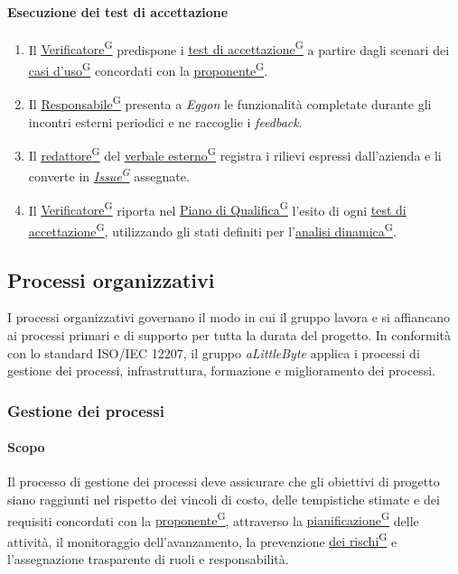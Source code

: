 \documentclass[a4paper,12pt]{article}
\providecommand{\glslink}[2]{\href{https://alittlebyte-19.github.io/Documentazione/glossario.html\#gls-#1}{\underline{#2}\textsuperscript{\scriptsize G}}}
\begin{document}
\paragraph{Esecuzione dei test di accettazione}
\begin{enumerate}
    \item Il \glslink{verificatore}{Verificatore} predispone i \glslink{test-di-accettazione}{test di accettazione} a partire dagli scenari dei \glslink{caso-d-uso-uc}{casi d'uso} concordati con la \glslink{committente-proponente}{proponente}.
    \item Il \glslink{responsabile}{Responsabile} presenta a \textit{Eggon} le funzionalità completate durante gli incontri esterni periodici e ne raccoglie i \textit{feedback}.
    \item Il \glslink{redattore}{redattore} del \glslink{verbale-esterno}{verbale esterno} registra i rilievi espressi dall'azienda e li converte in \textit{\glslink{issue}{Issue}} assegnate.
    \item Il \glslink{verificatore}{Verificatore} riporta nel \glslink{piano-di-qualifica}{Piano di Qualifica} l'esito di ogni \glslink{test-di-accettazione}{test di accettazione}, utilizzando gli stati definiti per l'\glslink{analisi-dinamica}{analisi dinamica}.
\end{enumerate}

\subsection{Processi organizzativi}
I processi organizzativi governano il modo in cui il gruppo lavora e si affiancano ai processi primari e di supporto per tutta la durata del progetto. In conformità con lo standard ISO/IEC 12207, il gruppo \textit{aLittleByte} applica i processi di gestione dei processi, infrastruttura, formazione e miglioramento dei processi.

\subsubsection{Gestione dei processi}

\paragraph{Scopo}
Il processo di gestione dei processi deve assicurare che gli obiettivi di progetto siano raggiunti nel rispetto dei vincoli di costo, delle tempistiche stimate e dei requisiti concordati con la \glslink{committente-proponente}{proponente}, attraverso la \glslink{pianificazione}{pianificazione} delle attività, il monitoraggio dell'avanzamento, la prevenzione \glslink{mitigazione-dei-rischi}{dei rischi} e l'assegnazione trasparente di ruoli e responsabilità.
\end{document}
